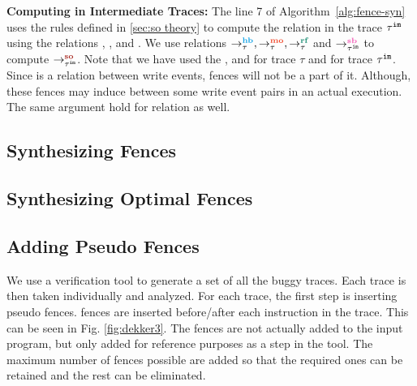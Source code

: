\noindent\textbf{Computing \lso in Intermediate Traces:} 
The line 7 of Algorithm~\ref{alg:fence-syn} uses the rules defined in 
\textsection\ref{sec:so theory} to compute the \lso relation in the trace 
$ {\tau}^{\mathtt{im}} $ using the relations \lhb, \lmo, \lrf and \lsb. 
We use relations $ \setHB, \setMO, \setRF $ and $ \seqb{\im{\tau}}{}{} $ to compute $ \so{\im{\tau}}{}{} $.
Note that we have used the \lhb, \lmo and \lrf for trace $ \tau $ and \lsb 
for trace $ {\tau}^{\mathtt{im}} $. 
Since \lmo is a relation between write events, fences will not be a part 
of it. Although, these fences may induce \lmo between some write event 
pairs in an actual execution. 
The same argument hold for \lrf relation as well.
 

\subsection{Synthesizing Fences}

\subsection{Synthesizing Optimal Fences}


\subsection{Adding Pseudo Fences}
\par
We use a verification tool to generate a set of all the buggy traces. 
Each trace is then taken individually and analyzed. For each trace, 
the first step is inserting pseudo fences. \mosc fences are inserted 
before/after each instruction in the trace. This can be seen in 
Fig. \ref{fig:dekker3}. The fences are not actually added to the 
input program, but only added for reference purposes as a step in 
the tool. The maximum number of fences possible are added so that 
the required ones can be retained and the rest can be eliminated.

